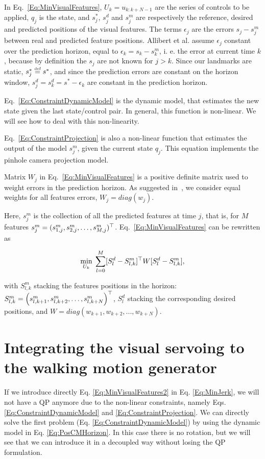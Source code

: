 In Eq.~\ref{Eq:MinVisualFeatures}, $U_{k}=u_{k:k+N-1}$ are the series of controls to be applied, $q_j$ is the state, and $s^*_j$, $s^d_j$ and $s^m_j$ are respectively the reference, desired and predicted positions of the visual features. The terms $\epsilon_j$ are the errors $s_j-s^m_j$ between real and predicted feature positions.
Allibert et al. assume $\epsilon_j$ constant over the prediction horizon, equal to $\epsilon_k=s_k-s^m_k$, i. e. the error at current time $k$, because by definition the $s_j$ are not known for $j>k$.
Since our landmarks are static, $s^*_j \stackrel{\mbox{\tiny def}}{=} s^*$, and since the prediction errors are constant on the horizon window, $s^d_j=s^d_k=s^*-\epsilon_k$ are constant in the prediction horizon.

Eq.~\ref{Eq:ConstraintDynamicModel} is the dynamic model, that estimates the new state given the last state/control pair. In general, this function is non-linear. We will see how to deal with this non-linearity.

Eq.~\ref{Eq:ConstraintProjection} is also a non-linear function that estimates the output of the model $s^m_j$, given the current state $q_j$. This equation implements the pinhole camera projection model.

Matrix $W_j$ in Eq.~\ref{Eq:MinVisualFeatures} is a positive definite matrix  used to weight errors in the prediction horizon. As suggested in~\cite{Allibert2010}, we   consider equal weights for all features errors, $W_j = diag(w_j)$. 

Here, $s^m_j$ is the collection of all the predicted features at time $j$, that is, for $M$ features $s^m_j = ( s_{1,j}^m, s_{2,j}^m, \hdots, s_{M,j}^m )^{\top} $. Eq.~\ref{Eq:MinVisualFeatures} can be rewritten as

\begin{equation}
\label{Eq:MinVisualFeatures2}
 \min_{U_{k}} \; \sum\limits_{l=0}^{M}  [S^d_{l} - S^m_{l,k}]^{\top} W [S^d_{l} - S^m_{l,k}],
\end{equation}

with $S^m_{l,k}$ stacking the features positions in the horizon: $S^m_{l,k} =  \left(
  s^m_{l,k+1},
  s^m_{l,k+2},
 \dots,
  s^m_{l,k+N}
 \right)^{\top}$, $S^d_{l}$ stacking the corresponding desired positions, and $W = diag(w_{k+1},w_{k+2},...,w_{k+N})$.

\section{Integrating the visual servoing to the walking motion generator}
\label{sec:integration}
If we introduce directly Eq. \ref{Eq:MinVisualFeatures2} in Eq. \ref{Eq:MinJerk}, we will not have a QP anymore due to the non-linear constraints, namely Eqs. \ref{Eq:ConstraintDynamicModel} and \ref{Eq:ConstraintProjection}. We can directly solve the first problem (Eq. \ref{Eq:ConstraintDynamicModel}) by using the dynamic model in Eq. \ref{Eq:PosCMHorizon}. In this case there is no rotation, but we will see that we can introduce it in a decoupled way without losing the QP formulation.

